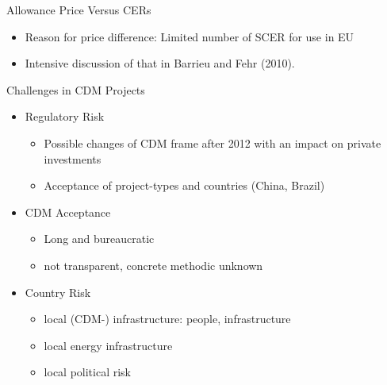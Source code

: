 {Allowance Price Versus CERs}
\begin{itemize}
\item<1-> Reason for price difference: Limited number of SCER for use in EU
\item<2-> Intensive discussion of that in Barrieu and Fehr (2010).
\end{itemize}

{Challenges in CDM Projects}
\begin{itemize}
\item<1-> Regulatory  Risk
\begin{itemize}
\item Possible changes of CDM frame after 2012 with an impact on private investments
\item Acceptance of project-types and countries (China, Brazil)
\end{itemize}
\item<2-> CDM Acceptance
\begin{itemize}
\item Long and bureaucratic
\item not transparent, concrete methodic unknown
\end{itemize}
\item<3-> Country Risk
\begin{itemize}
\item local (CDM-) infrastructure: people, infrastructure
\item local energy infrastructure
\item local political risk
\end{itemize}

\end{itemize}

